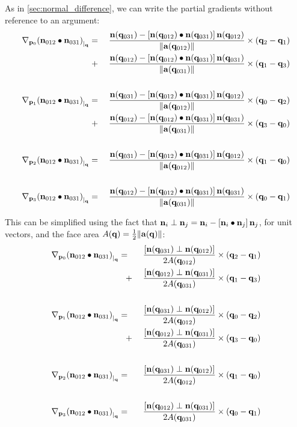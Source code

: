 As in \autoref{sec:normal_difference}, we can write the partial gradients
without reference to an argument:
\begin{eqnarray}
\label{eq:normal_dot_gradient}
\Gc{\p_0}{(\n_{012} \bullet \n_{031})}{\q}
& = \; &
{ { \n(\q_{031}) - \left[ \n(\q_{012}) \bullet \n(\q_{031}) \right] \n(\q_{012}) }
\over {\| \a (\q_{012}) \| } }
\times (\q_2 - \q_1)
\\
& \; + &
{ { \n(\q_{012}) - \left[ \n(\q_{012}) \bullet \n(\q_{031}) \right] \n(\q_{031})  }
\over {\| \a (\q_{031}) \| }}
\times (\q_1 - \q_3)
\nonumber \\
& & \nonumber \\
\Gc{\p_1}{(\n_{012} \bullet \n_{031})}{\q}
& = \; &
{ { \n(\q_{031}) - \left[ \n(\q_{012}) \bullet \n(\q_{031}) \right] \n(\q_{012})  }
\over {\| \a (\q_{012}) \| } }
\times (\q_0 - \q_2)
\nonumber \\
& \; + &
{{ \n(\q_{012}) - \left[ \n(\q_{012}) \bullet \n(\q_{031}) \right] \n(\q_{031})   }
\over {\| \a (\q_{031}) \| }}
\times (\q_3 - \q_0)
\nonumber \\
& & \nonumber \\
\Gc{\p_2}{(\n_{012} \bullet \n_{031})}{\q}
& = \; &
{{ \n(\q_{031}) - \left[ \n(\q_{012}) \bullet \n(\q_{031}) \right] \n(\q_{012})  }
\over {\| \a (\q_{012}) \| } }
\times (\q_1 - \q_0)
\nonumber \\
& & \nonumber \\
\Gc{\p_3}{(\n_{012} \bullet \n_{031})}{\q}
& = \; &
{ { \n(\q_{012}) - \left[ \n(\q_{012}) \bullet \n(\q_{031}) \right] \n(\q_{031}) }
\over {\| \a (\q_{031}) \| } }
\times (\q_0 - \q_1)
\nonumber
\end{eqnarray}

This can be simplified using the fact that
\({\mathbf n}_i \perp {\mathbf n}_j = {\mathbf n}_i - \left[ {\mathbf n}_i \bullet {\mathbf n}_j \right] {\mathbf n}_j\), for unit vectors,
and the face area \(A({\mathbf q}) = \frac{1}{2} \| {\mathbf a}({\mathbf q}) \|\):
\begin{eqnarray}
\label{eq:simplified_normal_dot_gradient}
\Gc{\p_0}{(\n_{012} \bullet \n_{031})}{\q}
& = \;\;\; &
\frac{\left[ \n(\q_{031}) \perp \n(\q_{012}) \right]}{2A(\q_{012})}
\times (\q_2 - \q_1)
\\
& \;\;\; + &
\frac{\left[ \n(\q_{012}) \perp \n(\q_{031}) \right]}{2A(\q_{031})}
\times (\q_1 - \q_3)
\nonumber \\
& & \nonumber \\
\Gc{\p_1}{(\n_{012} \bullet \n_{031})}{\q}
& = \;\;\; &
\frac{\left[ \n(\q_{031}) \perp \n(\q_{012}) \right]}{2A(\q_{012})}
\times (\q_0 - \q_2)
\nonumber \\
& \;\;\; + &
\frac{\left[ \n(\q_{012}) \perp \n(\q_{031}) \right]}{2A(\q_{031})}
\times (\q_3 - \q_0)
\nonumber \\
& & \nonumber \\
\Gc{\p_2}{(\n_{012} \bullet \n_{031})}{\q}
& = \;\;\; &
\frac{\left[ \n(\q_{031}) \perp \n(\q_{012}) \right]}{2A(\q_{012})}
\times (\q_1 - \q_0)
\nonumber \\
& & \nonumber \\
\Gc{\p_3}{(\n_{012} \bullet \n_{031})}{\q}
& = \;\;\; &
\frac{\left[ \n(\q_{012}) \perp \n(\q_{031}) \right]}{2A(\q_{031})}
\times (\q_0 - \q_1)
\nonumber
\end{eqnarray}

